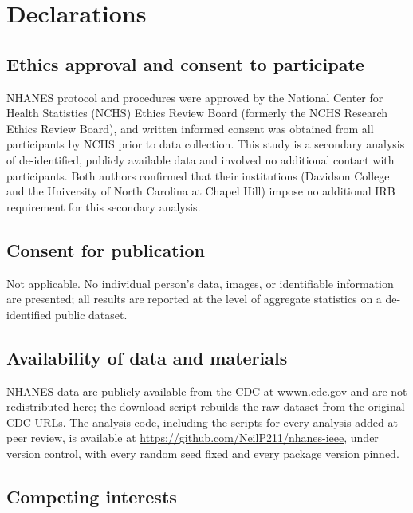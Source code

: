 \documentclass[12pt]{article}
\begin{document}
\clearpage

\doublespacing

\section*{Declarations}

\subsection*{Ethics approval and consent to participate}

NHANES protocol and procedures were approved by the National Center for Health Statistics (NCHS) Ethics Review Board (formerly the NCHS Research Ethics Review Board), and written informed consent was obtained from all participants by NCHS prior to data collection. This study is a secondary analysis of de-identified, publicly available data and involved no additional contact with participants. Both authors confirmed that their institutions (Davidson College and the University of North Carolina at Chapel Hill) impose no additional IRB requirement for this secondary analysis.

\subsection*{Consent for publication}

Not applicable. No individual person's data, images, or identifiable information are presented; all results are reported at the level of aggregate statistics on a de-identified public dataset.

\subsection*{Availability of data and materials}

NHANES data are publicly available from the CDC at wwwn.cdc.gov and are not redistributed here; the download script rebuilds the raw dataset from the original CDC URLs. The analysis code, including the scripts for every analysis added at peer review, is available at \url{https://github.com/NeilP211/nhanes-ieee}, under version control, with every random seed fixed and every package version pinned.

\subsection*{Competing interests}
\end{document}
